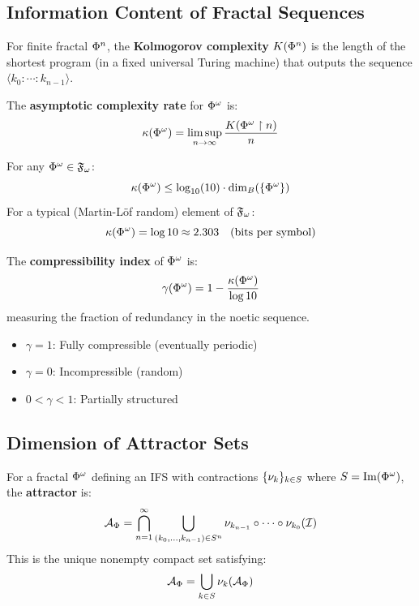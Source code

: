 \subsection{Information Content of Fractal Sequences}

\begin{definition}
\label{def:kolmogorov-fractal}
For finite fractal $\Phi^{n}$, the \textbf{Kolmogorov complexity} $K(\Phi^{n})$ is the length of the shortest program (in a fixed universal Turing machine) that outputs the sequence $\langle k_0 : \cdots : k_{n-1} \rangle$.

The \textbf{asymptotic complexity rate} for $\Phi^{\omega}$ is:
\[
\kappa(\Phi^{\omega}) = \limsup_{n \to \infty} \frac{K(\Phi^{\omega} \restriction n)}{n}
\]
\end{definition}

\begin{theorem}
\label{thm:complexity-dimension}
For any $\Phi^{\omega} \in \mathfrak{F}_\omega$:
\[
\kappa(\Phi^{\omega}) \leq \log_{10}(10) \cdot \dim_B(\{\Phi^{\omega}\})
\]
For a typical (Martin-L\"{o}f random) element of $\mathfrak{F}_\omega$:
\[
\kappa(\Phi^{\omega}) = \log 10 \approx 2.303 \quad \text{(bits per symbol)}
\]
\end{theorem}

\begin{definition}
\label{def:compressibility}
The \textbf{compressibility index} of $\Phi^{\omega}$ is:
\[
\gamma(\Phi^{\omega}) = 1 - \frac{\kappa(\Phi^{\omega})}{\log 10}
\]
measuring the fraction of redundancy in the noetic sequence.
\begin{itemize}
  \item $\gamma = 1$: Fully compressible (eventually periodic)
  \item $\gamma = 0$: Incompressible (random)
  \item $0 < \gamma < 1$: Partially structured
\end{itemize}
\end{definition}

\subsection{Dimension of Attractor Sets}

\begin{definition}
\label{def:ifs-attractor}
For a fractal $\Phi^{\omega}$ defining an IFS with contractions $\{\nu_{k}\}_{k \in S}$ where $S = \mathrm{Im}(\Phi^{\omega})$, the \textbf{attractor} is:
\[
\mathcal{A}_\Phi = \bigcap_{n=1}^\infty \bigcup_{(k_0, \ldots, k_{n-1}) \in S^n} \nu_{k_{n-1}} \circ \cdots \circ \nu_{k_0}(\mathcal{I})
\]
This is the unique nonempty compact set satisfying:
\[
\mathcal{A}_\Phi = \bigcup_{k \in S} \nu_{k}(\mathcal{A}_\Phi)
\]
\end{definition}

